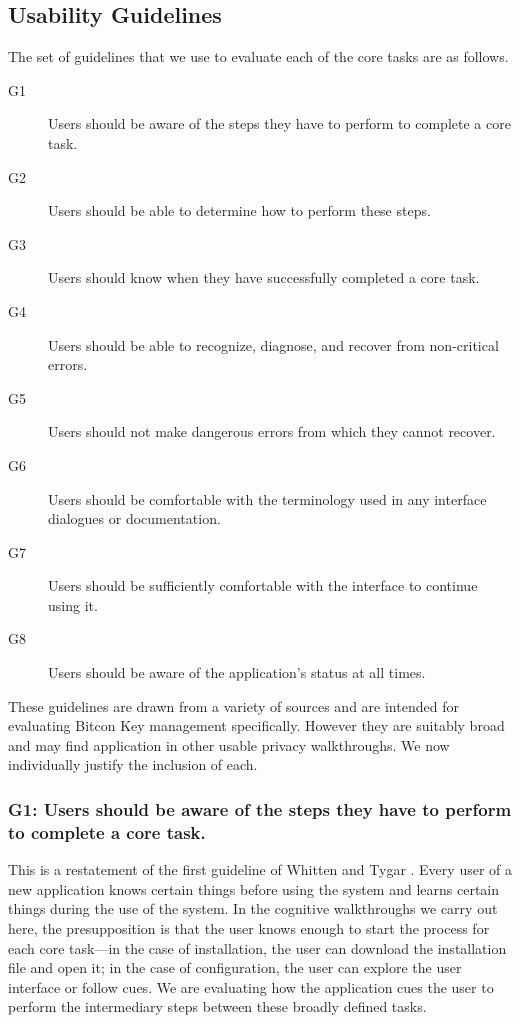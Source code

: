 
\subsection{Usability Guidelines} %

	The set of guidelines that we use to evaluate each of the core tasks are as follows.
	
\begin{description}
	\item[G1] Users should be aware of the steps they have to perform to complete a core task.
	\item[G2] Users should be able to determine how to perform these steps.
	\item[G3] Users should know when they have successfully completed a core task.
	\item[G4] Users should be able to recognize, diagnose, and recover from non-critical errors.
	\item[G5] Users should not make dangerous errors from which they cannot recover.
	\item[G6] Users should be comfortable with the terminology used in any interface dialogues or documentation.
	\item[G7] Users should be sufficiently comfortable with the interface to continue using it.
	\item[G8] Users should be aware of the application's status at all times.
\end{description}

	These guidelines are drawn from a variety of sources \cite{cw,johnny,karat,p3p,pvo,clark} and are intended for evaluating Bitcon Key management specifically. However they are suitably broad and may find application in other usable privacy walkthroughs. We now individually justify the inclusion of each.
	
\subsubsection*{G1: Users should be aware of the steps they have to perform to complete a core task.} This is a restatement of the first guideline of Whitten and Tygar \cite{johnny}. Every user of a new application knows certain things before using the system and learns certain things during the use of the system. In the cognitive walkthroughs we carry out here, the presupposition is that the user knows enough to start the process for each core task---in the case of installation, the user can download the installation file and open it; in the case of configuration, the user can explore the user interface or follow cues. We are evaluating how the application cues the user to perform the intermediary steps between these broadly defined tasks. 
	
